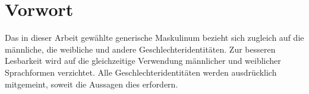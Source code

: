 \chapter{Vorwort}

Das in dieser Arbeit gewählte generische Maskulinum bezieht sich zugleich auf die männliche, die weibliche und andere Geschlechteridentitäten. Zur besseren Lesbarkeit wird auf die gleichzeitige Verwendung männlicher und weiblicher Sprachformen verzichtet. Alle Geschlechteridentitäten werden ausdrücklich mitgemeint, soweit die Aussagen dies erfordern.


%
%
